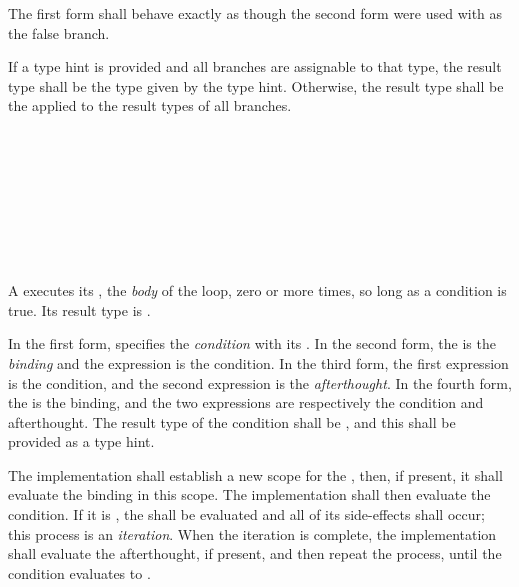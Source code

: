 \specsubsubitem
The first form shall behave exactly as though the second form were used with
 as the false branch.

\specsubsubitem
If a type hint is provided and all branches are assignable to that type, the
result type shall be the type given by the type hint. Otherwise, the result type
shall be the  applied to the result
types of all branches.


\begin{grammar}
 \\
	 \terminal{(}  \terminal{)}  \\

 \\
	 \\
	 \terminal{;}  \\
	 \terminal{;}  \\
	 \terminal{;}  \terminal{;}  \\
\end{grammar}

\specsubsubitem
A  executes its , the
\textit{body} of the loop, zero or more times, so long as a condition is true.
Its result type is .

\specsubsubitem
In the first form,  specifies the \textit{condition}
with its . In the second form, the
 is the \textit{binding} and the expression is the
condition. In the third form, the first expression is the condition, and the
second expression is the \textit{afterthought}. In the fourth form, the
 is the binding, and the two expressions are
respectively the condition and afterthought. The result type of the condition
shall be , and this shall be provided as a type hint.

\specsubsubitem
The implementation shall establish a new scope for the
, then, if present, it shall evaluate the binding in
this scope. The implementation shall then evaluate the condition. If it is
, the  shall be evaluated and all of its
side-effects shall occur; this process is an \textit{iteration}. When the
iteration is complete, the implementation shall evaluate the afterthought, if
present, and then repeat the process, until the condition evaluates to
.

